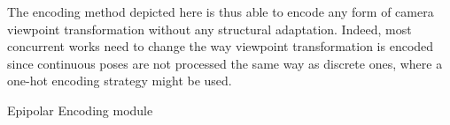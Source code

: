 The encoding method depicted here is thus able to encode any form of camera viewpoint transformation without any structural adaptation. Indeed, most concurrent works need to change the way viewpoint transformation is encoded since continuous poses are not processed the same way as discrete ones, where a one-hot encoding strategy might be used. 
\begin{algorithm}[h!]
    \caption{Epipolar Encoding module \label{alg:pseudoCode}}
    
    \medskip
    
\end{algorithm}

